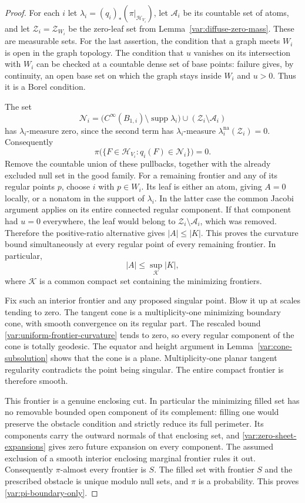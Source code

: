 \begin{proof}
For each $i$ let $\lambda_i=(q_i)_*(\pi|_{\mathcal H_{V_i}})$,
let $\mathcal A_i$ be its countable set of atoms, and let
$\mathcal Z_i=\mathcal Z_{W_i}$ be the zero-leaf set from
Lemma~\ref{var:diffuse-zero-mass}.  These are measurable sets.
For the last assertion, the condition that a graph meets $W_i$
is open in the graph topology.  The condition that $u$ vanishes
on its intersection with $W_i$ can be checked at a countable
dense set of base points: failure gives, by continuity, an open
base set on which the graph stays inside $W_i$ and $u>0$.
Thus it is a Borel condition.

The set
\[
 \mathcal N_i=
    \bigl(C^\infty(B_{1,i})\setminus\operatorname{supp}\lambda_i\bigr)
         \cup(\mathcal Z_i\setminus\mathcal A_i)
\]
has $\lambda_i$-measure zero, since the second term has
$\lambda_i$-measure $\lambda_i^{\mathrm{na}}(\mathcal Z_i)=0$.
Consequently
\[
 \pi\bigl(\{F\in\mathcal H_{V_i}:q_i(F)\in\mathcal N_i\}\bigr)=0.
\]
Remove the countable union of these pullbacks, together with the
already excluded null set in the good family.  For a remaining
frontier and any of its regular points $p$, choose $i$ with
$p\in W_i$.  Its leaf is either an atom, giving $A=0$ locally,
or a nonatom in the support of $\lambda_i$.  In the latter case
the common Jacobi argument applies on its entire connected
regular component.  If that component had $u=0$ everywhere,
the leaf would belong to $\mathcal Z_i\setminus\mathcal A_i$,
which was removed.  Therefore the positive-ratio alternative
gives $|A|\leq |K|$.  This proves the curvature bound
simultaneously at every regular point of every remaining
frontier.
In particular,
\begin{equation}\label{var:uniform-frontier-curvature}
 |A|\leq\sup_{\mathcal K}|K|,
\end{equation}
where $\mathcal K$ is a common compact set containing the
minimizing frontiers.

Fix such an interior frontier and any proposed singular point.
Blow it up at scales tending to zero.  The tangent cone is a
multiplicity-one minimizing boundary cone, with smooth
convergence on its regular part.  The rescaled bound
\eqref{var:uniform-frontier-curvature} tends to zero, so every
regular component of the cone is totally geodesic.  The
equator and height argument in
Lemma~\ref{var:cone-subsolution} shows that the cone is a plane.
Multiplicity-one planar tangent regularity contradicts the
point being singular.  The entire compact frontier is therefore
smooth.

This frontier is a genuine enclosing cut.  In particular the
minimizing filled set has no removable bounded open component
of its complement: filling one would preserve the obstacle
condition and strictly reduce its full perimeter.  Its
components carry the outward normals of that enclosing set,
and \eqref{var:zero-sheet-expansions} gives zero future expansion
on every component.  The assumed exclusion of a smooth
interior enclosing marginal frontier rules it out.
Consequently $\pi$-almost every frontier is $S$.  The filled
set with frontier $S$ and the prescribed obstacle is unique
modulo null sets, and $\pi$ is a probability.  This proves
\eqref{var:pi-boundary-only}.
\end{proof}
